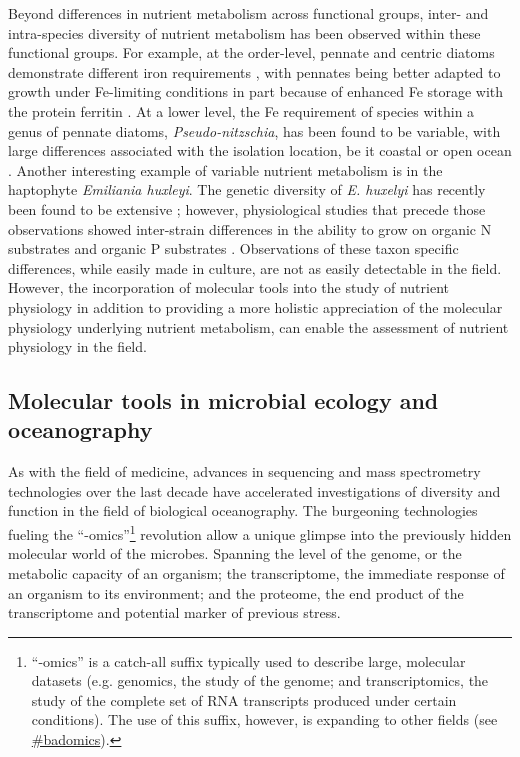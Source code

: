 Beyond differences in nutrient metabolism across functional groups, inter- and intra-species diversity of nutrient metabolism has been observed within these functional groups. For example, at the order-level, pennate and centric diatoms demonstrate different iron requirements \citep{Marchetti2006}, with pennates being better adapted to growth under Fe-limiting conditions in part because of enhanced Fe storage with the protein ferritin \citep{Marchetti2009a}. At a lower level, the Fe requirement of species within a genus of pennate diatoms, \textit{Pseudo-nitzschia}, has been found to be variable, with large differences associated with the isolation location, be it coastal or open ocean \citep{Marchetti2006}. Another interesting example of variable nutrient metabolism is in the haptophyte \textit{Emiliania huxleyi}. The genetic diversity of \textit{E. huxelyi} has recently been found to be extensive \citep{Read2013}; however, physiological studies that precede those observations showed inter-strain differences in the ability to grow on organic N substrates \citep{Strom2009} and organic P substrates \citep{Dyhrman2003}. Observations of these taxon specific differences, while easily made in culture, are not as easily detectable in the field. However, the incorporation of molecular tools into the study of nutrient physiology in addition to providing a more holistic appreciation of the molecular physiology underlying nutrient metabolism, can enable the assessment of nutrient physiology in the field.  

\subsection{Molecular tools in microbial ecology and oceanography}

As with the field of medicine, advances in sequencing and mass spectrometry technologies over the last decade have accelerated investigations of diversity and function in the field of biological oceanography. The burgeoning technologies fueling the ``-omics''\footnote{``-omics'' is a catch-all suffix typically used to describe large, molecular datasets (e.g. genomics, the study of the genome; and transcriptomics, the study of the complete set of RNA transcripts produced under certain conditions). The use of this suffix, however, is expanding to other fields (see \href{https://twitter.com/search?q=\%23badomics&src=typd&lang=en}{\#badomics}).} revolution allow a unique glimpse into the previously hidden molecular world of the microbes. Spanning the level of the genome, or the metabolic capacity of an organism; the transcriptome, the immediate response of an organism to its environment; and the proteome, the end product of the transcriptome and potential marker of previous stress.  \par

